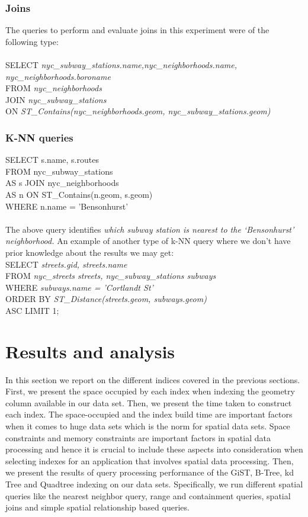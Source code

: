\documentclass{sig-alternate-05-2015}
\begin{document}
\subsubsection{Joins}
The queries to perform and evaluate joins in this experiment were of the following type:\\\\
SELECT \textit{nyc_subway_stations.name,nyc_neighborhoods.name, nyc_neighborhoods.boroname}\\
FROM \textit{nyc_neighborhoods}\\
JOIN \textit{nyc_subway_stations}\\
ON \textit{ST_Contains(nyc_neighborhoods.geom, nyc_subway_stations.geom)}
\subsubsection{K-NN queries}
SELECT s.name, s.routes\\
FROM nyc_subway_stations\\
AS s JOIN nyc_neighborhoods\\
AS n ON ST_Contains(n.geom, s.geom)\\
WHERE n.name = 'Bensonhurst' \\\\
%
The above query identifies \textit{which subway station is nearest to the ‘Bensonhurst' neighborhood.}
An example of another type of k-NN query where we don't have prior knowledge about the results we may get:\\
SELECT \textit{streets.gid, streets.name}\\
FROM \textit{nyc_streets streets, nyc_subway_stations subways}\\
WHERE \textit{subways.name = 'Cortlandt St'}\\
ORDER BY \textit{ST_Distance(streets.geom, subways.geom)}\\
ASC LIMIT 1;



\section{Results and analysis}
In this section we report on the different indices covered in the previous sections. First, we present the space occupied by each index when indexing the geometry column available in our data set. Then, we present the time taken to construct each index. The space-occupied and the index build time are important factors when it comes to huge data sets which is the norm for spatial data sets. Space constraints and memory constraints are important factors in spatial data processing and hence it is crucial to include these aspects into consideration when selecting indexes for an application that involves spatial data processing. Then, we present the results of query processing performance of the GiST, B-Tree, kd Tree and Quadtree indexing on our data sets. Specifically, we run different spatial queries like the nearest neighbor query, range and containment queries, spatial joins and simple spatial relationship based queries.
\end{document}
